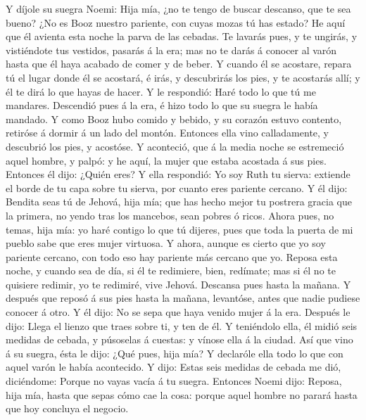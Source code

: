  Y díjole su suegra Noemi: Hija mía, ¿no te tengo de buscar
descanso, que te sea bueno?  ¿No es Booz nuestro pariente,
con cuyas mozas tú has estado? He aquí que él avienta esta noche la
parva de las cebadas.  Te lavarás pues, y te ungirás, y
vistiéndote tus vestidos, pasarás á la era; mas no te darás á conocer al
varón hasta que él haya acabado de comer y de beber.  Y
cuando él se acostare, repara tú el lugar donde él se acostará, é irás,
y descubrirás los pies, y te acostarás allí; y él te dirá lo que hayas
de hacer.  Y le respondió: Haré todo lo que tú me mandares.
 Descendió pues á la era, é hizo todo lo que su suegra le
había mandado.  Y como Booz hubo comido y bebido, y su
corazón estuvo contento, retiróse á dormir á un lado del montón.
Entonces ella vino calladamente, y descubrió los pies, y acostóse.
 Y aconteció, que á la media noche se estremeció aquel
hombre, y palpó: y he aquí, la mujer que estaba acostada á sus pies.
 Entonces él dijo: ¿Quién eres? Y ella respondió: Yo soy
Ruth tu sierva: extiende el borde de tu capa sobre tu sierva, por cuanto
eres pariente cercano.  Y él dijo: Bendita seas tú de
Jehová, hija mía; que has hecho mejor tu postrera gracia que la primera,
no yendo tras los mancebos, sean pobres ó ricos.  Ahora
pues, no temas, hija mía: yo haré contigo lo que tú dijeres, pues que
toda la puerta de mi pueblo sabe que eres mujer virtuosa. 
Y ahora, aunque es cierto que yo soy pariente cercano, con todo eso hay
pariente más cercano que yo.  Reposa esta noche, y cuando
sea de día, si él te redimiere, bien, redímate; mas si él no te quisiere
redimir, yo te redimiré, vive Jehová. Descansa pues hasta la mañana.
 Y después que reposó á sus pies hasta la mañana,
levantóse, antes que nadie pudiese conocer á otro. Y él dijo: No se sepa
que haya venido mujer á la era.  Después le dijo: Llega el
lienzo que traes sobre ti, y ten de él. Y teniéndolo ella, él midió seis
medidas de cebada, y púsoselas á cuestas: y vínose ella á la ciudad.
 Así que vino á su suegra, ésta le dijo: ¿Qué pues, hija
mía? Y declaróle ella todo lo que con aquel varón le había acontecido.
 Y dijo: Estas seis medidas de cebada me dió, diciéndome:
Porque no vayas vacía á tu suegra.  Entonces Noemi dijo:
Reposa, hija mía, hasta que sepas cómo cae la cosa: porque aquel hombre
no parará hasta que hoy concluya el negocio.

